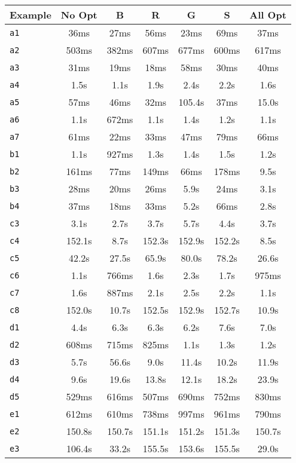 \begin{tabular}{lcccccc}
\toprule
Example & No Opt & B & R & G & S & All Opt \\
\midrule
\texttt{a1} & 36ms & 27ms & 56ms & 23ms & 69ms & 37ms \\
\texttt{a2} & 503ms & 382ms & 607ms & 677ms & 600ms & 617ms \\
\texttt{a3} & 31ms & 19ms & 18ms & 58ms & 30ms & 40ms \\
\texttt{a4} & 1.5s & 1.1s & 1.9s & 2.4s & 2.2s & 1.6s \\
\texttt{a5} & 57ms & 46ms & 32ms & 105.4s & 37ms & 15.0s \\
\texttt{a6} & 1.1s & 672ms & 1.1s & 1.4s & 1.2s & 1.1s \\
\texttt{a7} & 61ms & 22ms & 33ms & 47ms & 79ms & 66ms \\
\texttt{b1} & 1.1s & 927ms & 1.3s & 1.4s & 1.5s & 1.2s \\
\texttt{b2} & 161ms & 77ms & 149ms & 66ms & 178ms & 9.5s \\
\texttt{b3} & 28ms & 20ms & 26ms & 5.9s & 24ms & 3.1s \\
\texttt{b4} & 37ms & 18ms & 33ms & 5.2s & 66ms & 2.8s \\
\texttt{c3} & 3.1s & 2.7s & 3.7s & 5.7s & 4.4s & 3.7s \\
\texttt{c4} & 152.1s & 8.7s & 152.3s & 152.9s & 152.2s & 8.5s \\
\texttt{c5} & 42.2s & 27.5s & 65.9s & 80.0s & 78.2s & 26.6s \\
\texttt{c6} & 1.1s & 766ms & 1.6s & 2.3s & 1.7s & 975ms \\
\texttt{c7} & 1.6s & 887ms & 2.1s & 2.5s & 2.2s & 1.1s \\
\texttt{c8} & 152.0s & 10.7s & 152.5s & 152.9s & 152.7s & 10.9s \\
\texttt{d1} & 4.4s & 6.3s & 6.3s & 6.2s & 7.6s & 7.0s \\
\texttt{d2} & 608ms & 715ms & 825ms & 1.1s & 1.3s & 1.2s \\
\texttt{d3} & 5.7s & 56.6s & 9.0s & 11.4s & 10.2s & 11.9s \\
\texttt{d4} & 9.6s & 19.6s & 13.8s & 12.1s & 18.2s & 23.9s \\
\texttt{d5} & 529ms & 616ms & 507ms & 690ms & 752ms & 830ms \\
\texttt{e1} & 612ms & 610ms & 738ms & 997ms & 961ms & 790ms \\
\texttt{e2} & 150.8s & 150.7s & 151.1s & 151.2s & 151.3s & 150.7s \\
\texttt{e3} & 106.4s & 33.2s & 155.5s & 153.6s & 155.5s & 29.0s \\

\end{tabular}
